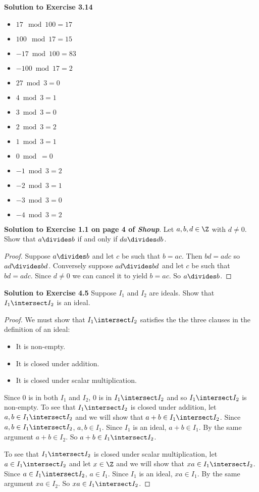 \documentclass[oneside,12pt]{amsart}
\begin{document}
\textbf{Solution to Exercise 3.14}
\begin{itemize}
\item $17 \mod 100 = 17$
\item $100 \mod 17 = 15$
\item $-17 \bmod 100 = 83$
\item $-100 \bmod 17 = 2$
\item $27 \bmod 3 = 0$
\item $4 \bmod 3 = 1$
\item $3 \bmod 3 = 0$
\item $2 \bmod 3 = 2$
\item $1 \bmod 3 = 1$
\item $0 \bmod  = 0$
\item $-1 \bmod 3 = 2$
\item $-2 \bmod 3 = 1$
\item $-3 \bmod 3 = 0$
\item $-4 \bmod 3 = 2$
\end{itemize}

\bigskip

\textbf{Solution to Exercise 1.1 on page 4 of \emph{Shoup}}.
Let $a,b,d\in\Z$ with $d\not=0$. Show that $a\divides b$ if and only if
$da\divides db$.
\begin{proof}
Suppose $a\divides b$ and let $c$ be such that $b=ac$. Then $bd=adc$ so
$ad \divides bd$. Conversely suppose $ad \divides bd$ and let $c$ be
such that $bd = adc$. Since $d\not=0$ we can cancel it to yield
$b=ac$. So $a\divides b$.
\end{proof}

\bigskip

\textbf{Solution to Exercise 4.5} Suppose $I_1$ and $I_2$ are ideals. Show that $I_1 \intersect I_2$ is an ideal.
\begin{proof}
We must show that  $I_1 \intersect I_2$  satisfies the the three clauses in the definition of an ideal:
\begin{itemize}
\item It is non-empty.
\item It is closed under addition.
\item It is closed under scalar multiplication.
\end{itemize}
Since 0 is in both $I_1$ and $I_2$, 0 is in  $I_1 \intersect I_2$ and so  $I_1 \intersect I_2$  is non-empty.
To see that $I_1 \intersect I_2$ is closed under addition, let $a, b\in I_1 \intersect I_2$ and we will show that $a+b\in  I_1 \intersect I_2$.
Since  $a, b\in I_1 \intersect I_2$,  $a, b\in I_1$. Since $I_1$ is an ideal, $a+b\in I_1$. By the same argument $a+b\in I_2$.
So $a+b\in I_1\intersect I_2$.

To see that $I_1 \intersect I_2$ is closed under scalar multiplication, let $a \in I_1 \intersect I_2$ and let $x\in\Z$ and we will show that $xa\in  I_1 \intersect I_2$.
Since  $a\in I_1 \intersect I_2$,  $a\in I_1$. Since $I_1$ is an ideal, $xa\in I_1$. By the same argument $xa\in I_2$.
So $xa\in I_1\intersect I_2$.
\end{proof}
\end{document}

